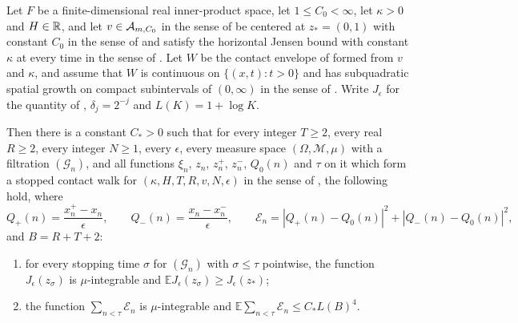 \begin{lemma}
Let $F$ be a finite-dimensional real inner-product space, let
$1\le C_0<\infty$, let $\kappa>0$ and $H\in\mathbb{R}$, and let
$v\in\mathcal{A}_{m,C_0}$ in the sense of  be centered at
$z_*=(0,1)$ with constant $C_0$ in the sense of  and
satisfy the horizontal Jensen bound with constant $\kappa$ at every time in the
sense of . Let $W$ be the contact envelope of
 formed from $v$ and $\kappa$, and assume that $W$ is
continuous on $\{(x,t):t>0\}$ and has subquadratic spatial growth on compact
subintervals of $(0,\infty)$ in the sense of .
Write $J_\epsilon$ for the quantity of , $\delta_j=2^{-j}$ and
$L(K)=1+\log K$.

Then there is a constant $C_*>0$ such that for every integer $T\ge2$, every
real $R\ge2$, every integer $N\ge1$, every $\epsilon$, every measure space
$(\Omega,\mathcal M,\mu)$ with a filtration $(\mathcal G_n)$, and all functions
$\xi_n$, $z_n$, $z^+_n$, $z^-_n$, $Q_0(n)$ and $\tau$ on it which form a stopped
contact walk for $(\kappa,H,T,R,v,N,\epsilon)$ in the sense of
, the following hold, where
\[
  Q_+(n)=\frac{x^+_n-x_n}{\epsilon},\qquad
  Q_-(n)=\frac{x_n-x^-_n}{\epsilon},\qquad
  \mathcal E_n=|Q_+(n)-Q_0(n)|^2+|Q_-(n)-Q_0(n)|^2,
\]
and $B=R+T+2$:
\begin{enumerate}
\item[(i)] for every stopping time $\sigma$ for $(\mathcal G_n)$ with
$\sigma\le\tau$ pointwise, the function $J_\epsilon(z_\sigma)$ is
$\mu$-integrable and $\mathbb E J_\epsilon(z_\sigma)\ge J_\epsilon(z_*)$;
\item[(ii)] the function $\sum_{n<\tau}\mathcal E_n$ is $\mu$-integrable and
$\mathbb E\sum_{n<\tau}\mathcal E_n\le C_*L(B)^4$.
\end{enumerate}
\end{lemma}
